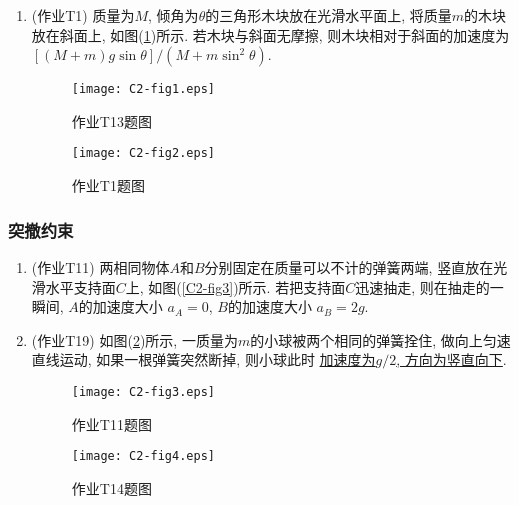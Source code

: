 \begin{enumerate}
	
	\item (作业T1) 质量为$M$, 倾角为$\theta$的三角形木块放在光滑水平面上, 将质量$m$的木块放在斜面上, 如图(\ref{C2-fig2})所示. 若木块与斜面无摩擦, 则木块相对于斜面的加速度为 \uline{$[(M+m) g \sin \theta]/(M + m \sin^2 \theta)$}. 
	
	\begin{figure}[htbp]
		\centering
		\begin{minipage}[t]{0.48\textwidth}
			\centering
			\texttt{[image: C2-fig1.eps]}
			\caption{作业T13题图}
			\label{C2-fig1}
		\end{minipage}
		\begin{minipage}[t]{0.48\textwidth}
			\centering
			\texttt{[image: C2-fig2.eps]}
			\caption{作业T1题图}
			\label{C2-fig2}
		\end{minipage}
	\end{figure}
	
\end{enumerate}

\subsubsection{突撤约束}

\begin{enumerate}
	
	\item (作业T11) 两相同物体$A$和$B$分别固定在质量可以不计的弹簧两端, 竖直放在光滑水平支持面$C$上, 如图(\ref{C2-fig3})所示. 若把支持面$C$迅速抽走, 则在抽走的一瞬间, $A$的加速度大小 \uline{$a_A = 0$}, $B$的加速度大小 \uline{$a_B = 2g$}. 
	
	\item (作业T19) 如图(\ref{C2-fig4})所示, 一质量为$m$的小球被两个相同的弹簧拴住, 做向上匀速直线运动, 如果一根弹簧突然断掉, 则小球此时 \uline{加速度为$g/2$, 方向为竖直向下}. 
	
	\begin{figure}[H]
		\centering
		\begin{minipage}[t]{0.48\textwidth}
			\centering
			\texttt{[image: C2-fig3.eps]}
			\caption{作业T11题图}
			\label{C2-fig3}
		\end{minipage}
		\begin{minipage}[t]{0.48\textwidth}
			\centering
			\texttt{[image: C2-fig4.eps]}
			\caption{作业T14题图}
			\label{C2-fig4}
		\end{minipage}
	\end{figure}
	
\end{enumerate}

\newpage
